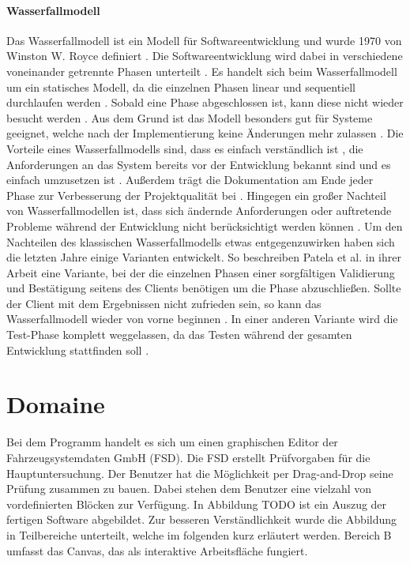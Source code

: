     \paragraph{Wasserfallmodell}
    Das Wasserfallmodell ist ein Modell für Softwareentwicklung \cite{24} und wurde 1970 von Winston W. Royce definiert \cite{25}. 
    Die Softwareentwicklung wird dabei in verschiedene voneinander getrennte Phasen unterteilt \cite{22}.
    Es handelt sich beim Wasserfallmodell um ein statisches Modell, da die einzelnen Phasen linear und sequentiell durchlaufen werden \cite{22}.
    Sobald eine Phase abgeschlossen ist, kann diese nicht wieder besucht werden \cite{22}. 
    Aus dem Grund ist das Modell besonders gut für Systeme geeignet, welche nach der Implementierung keine Änderungen mehr zulassen \cite{22}. 
    Die Vorteile eines Wasserfallmodells sind, dass es einfach verständlich ist \cite{22}, die Anforderungen an das System bereits vor der Entwicklung bekannt sind und es einfach umzusetzen ist \cite{23}.
    Außerdem trägt die Dokumentation am Ende jeder Phase zur Verbesserung der Projektqualität bei \cite{23}.
    Hingegen ein großer Nachteil von Wasserfallmodellen ist, dass sich ändernde Anforderungen oder auftretende Probleme während der Entwicklung nicht berücksichtigt werden können \cite{23}.
    Um den Nachteilen des klassischen Wasserfallmodells etwas entgegenzuwirken haben sich die letzten Jahre einige Varianten entwickelt.
    So beschreiben Patela et al. in ihrer Arbeit eine Variante, bei der die einzelnen Phasen einer sorgfältigen Validierung und Bestätigung seitens des Clients benötigen um die Phase abzuschließen. 
    Sollte der Client mit dem Ergebnissen nicht zufrieden sein, so kann das Wasserfallmodell wieder von vorne beginnen \cite{24}. 
    In einer anderen Variante wird die Test-Phase komplett weggelassen, da das Testen während der gesamten Entwicklung stattfinden soll \cite{25}.
    \section{Domaine}
    Bei dem Programm handelt es sich um einen graphischen Editor der Fahrzeugsystemdaten GmbH (FSD).
    Die FSD erstellt Prüfvorgaben für die Hauptuntersuchung.
    Der Benutzer hat die Möglichkeit per Drag-and-Drop seine Prüfung zusammen zu bauen.
    Dabei stehen dem Benutzer eine vielzahl von vordefinierten Blöcken zur Verfügung.
    In Abbildung TODO ist ein Auszug der fertigen Software abgebildet.
    Zur besseren Verständlichkeit wurde die Abbildung in Teilbereiche unterteilt, welche im folgenden kurz erläutert werden.
    Bereich B umfasst das Canvas, das als interaktive Arbeitsfläche fungiert.
    
